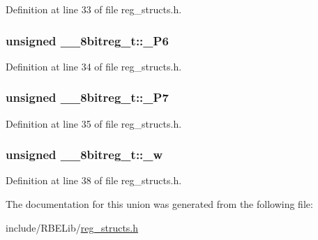 Definition at line 33 of file reg\-\_\-structs.\-h.

\hypertarget{union____8bitreg__t_aa3a7604eeb889d347ef856be027dc6ba}{
\subsubsection[{\-\_\-\-P6}]{\setlength{\rightskip}{0pt plus 5cm}unsigned \-\_\-\-\_\-8bitreg\-\_\-t\-::\-\_\-\-P6}}\label{union____8bitreg__t_aa3a7604eeb889d347ef856be027dc6ba}


Definition at line 34 of file reg\-\_\-structs.\-h.

\hypertarget{union____8bitreg__t_aae126f699a2181048e367daeaa2abc3f}{
\subsubsection[{\-\_\-\-P7}]{\setlength{\rightskip}{0pt plus 5cm}unsigned \-\_\-\-\_\-8bitreg\-\_\-t\-::\-\_\-\-P7}}\label{union____8bitreg__t_aae126f699a2181048e367daeaa2abc3f}


Definition at line 35 of file reg\-\_\-structs.\-h.

\hypertarget{union____8bitreg__t_ae67d36d5dda8021c96460fd7157055cb}{
\subsubsection[{\-\_\-w}]{\setlength{\rightskip}{0pt plus 5cm}unsigned \-\_\-\-\_\-8bitreg\-\_\-t\-::\-\_\-w}}\label{union____8bitreg__t_ae67d36d5dda8021c96460fd7157055cb}


Definition at line 38 of file reg\-\_\-structs.\-h.



The documentation for this union was generated from the following file\-:\begin{DoxyCompactItemize}
\item 
include/\-R\-B\-E\-Lib/\hyperlink{reg__structs_8h}{reg\-\_\-structs.\-h}\end{DoxyCompactItemize}
